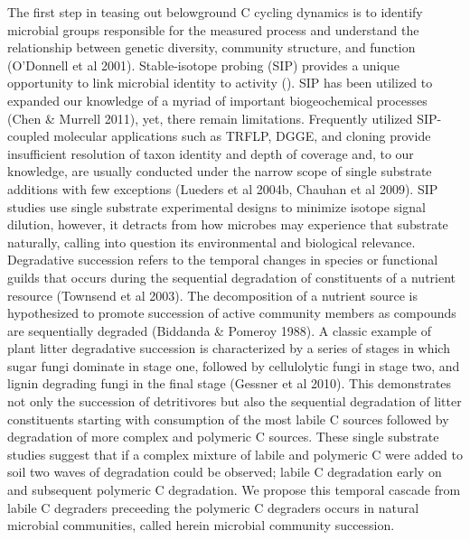 The first step in teasing out belowground C cycling dynamics is to identify microbial groups responsible for the measured process and understand the relationship between genetic diversity, community structure, and function (O’Donnell et al 2001). Stable-isotope probing (SIP) provides a unique opportunity to link microbial identity to activity (\cite{Chen_Murrell_2010}). SIP has been utilized to expanded our knowledge of a myriad of important biogeochemical processes (Chen & Murrell 2011), yet, there remain limitations. Frequently utilized SIP-coupled molecular applications such as TRFLP, DGGE, and cloning provide insufficient resolution of taxon identity and depth of coverage and, to our knowledge, are usually conducted under the narrow scope of single substrate additions with few exceptions (Lueders et al 2004b, Chauhan et al 2009). SIP studies use single substrate experimental designs to minimize isotope signal dilution, however, it detracts from how microbes may experience that substrate naturally, calling into question its environmental and biological relevance.
Degradative succession refers to the temporal changes in species or functional guilds that occurs during the sequential degradation of constituents of a nutrient resource (Townsend et al 2003).  The decomposition of a nutrient source is hypothesized to promote succession of active community members as compounds are sequentially degraded (Biddanda & Pomeroy 1988).  A classic example of plant litter degradative succession is characterized by a series of stages in which sugar fungi dominate in stage one, followed by cellulolytic fungi in stage two, and lignin degrading fungi in the final stage (Gessner et al 2010).  This demonstrates not only the succession of detritivores but also the sequential degradation of litter constituents starting with consumption of the most labile C sources followed by degradation of more complex and polymeric C sources. These single substrate studies suggest that if a complex mixture of labile and polymeric C were added to soil two waves of degradation could be observed; labile C degradation early on and subsequent polymeric C degradation.  We propose this temporal cascade from labile C degraders preceeding the polymeric C degraders occurs in natural microbial communities, called herein microbial community succession.  
    
